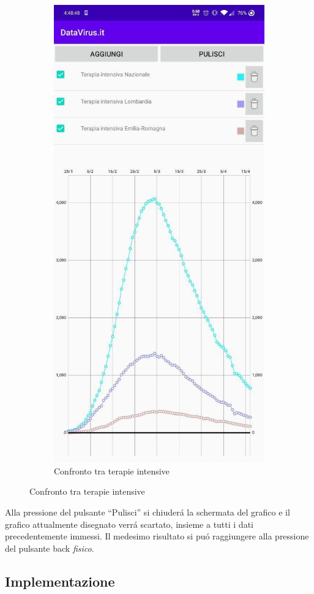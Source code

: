 \documentclass{article}
\newcommand{\quotes}[1]{``#1''}
\begin{document}
\begin{figure}[h]
\begin{subfigure}{.5\textwidth}
        \includegraphics[width=.7\linewidth]{chart_ICU.jpg}
        \caption{Confronto tra terapie intensive}
        \label{fig5:sub2}
      \end{subfigure}
    \end{figure}
    Alla pressione del pulsante \quotes{Pulisci} si chiuderá la schermata del grafico e il grafico attualmente disegnato verrá scartato, insieme a tutti i dati precedentemente immessi.
    Il medesimo risultato si puó raggiungere alla pressione del pulsante back \emph{fisico}.

    \subsection{Implementazione}
\end{document}
